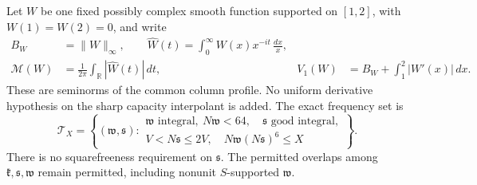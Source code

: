 Let \(W\) be one fixed possibly complex smooth function supported on
\([1,2]\), with \(W(1)=W(2)=0\), and write
\begin{equation}\label{rg:profile}
 \begin{aligned}
 B_W&=\|W\|_\infty,\qquad
 \widehat W(t)=\int_0^\infty W(x)x^{-it}\,\frac{dx}{x},\\
 \mathcal M(W)&=\frac1{2\pi}\int_{\mathbb R}|\widehat W(t)|\,dt,
 &V_1(W)&=B_W+\int_1^2|W'(x)|\,dx .
 \end{aligned}
\end{equation}
These are seminorms of the common column profile. No uniform
derivative hypothesis on the sharp capacity interpolant is added.
The exact frequency set is
\begin{equation}\label{rg:frequency-set}
 \mathcal T_X=\left\{(\mathfrak w,\mathfrak s):
 \begin{array}{l}
 \mathfrak w\text{ integral},\ N\mathfrak w<64,\quad
 \mathfrak s\text{ good integral},\\
 V<N\mathfrak s\le2V,\quad
 N\mathfrak w(N\mathfrak s)^6\le X
 \end{array}\right\}.
\end{equation}
There is no squarefreeness requirement on \(\mathfrak s\).
The permitted overlaps among \(\mathfrak k,\mathfrak s,\mathfrak w\)
remain permitted, including nonunit \(S\)-supported \(\mathfrak w\).

